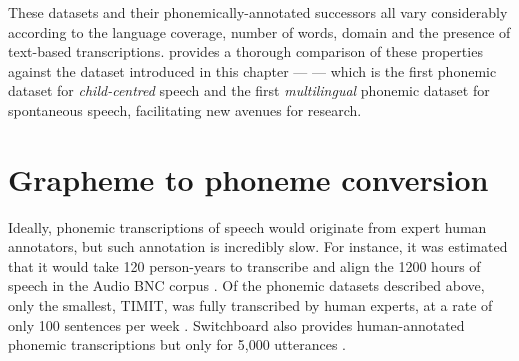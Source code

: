 \begin{sidewaystable}
\begin{threeparttable}
        \label{tab:13-dataset-properties}
    \end{threeparttable}
\end{sidewaystable}

These datasets and their phonemically-annotated successors all vary considerably according to the language coverage, number of words, domain and the presence of text-based transcriptions.  provides a thorough comparison of these properties against the dataset introduced in this chapter --- \ipachildes --- which is the first phonemic dataset for \emph{child-centred} speech and the first \emph{multilingual} phonemic dataset for spontaneous speech, facilitating new avenues for research. 

\section{Grapheme to phoneme conversion}\label{sec:13-g2p}



Ideally, phonemic transcriptions of speech would originate from expert human annotators, but such annotation is incredibly slow. For instance, it was estimated that it would take 120 person-years to transcribe and align the 1200 hours of speech in the Audio BNC corpus \citep{coleman2011mining}. Of the phonemic datasets described above, only the smallest, TIMIT, was fully transcribed by human experts, at a rate of only 100 sentences per week \citep{zue1996transcription, lamel1989speech}. Switchboard also provides human-annotated phonemic transcriptions but only for 5,000 utterances \citep{greenberg1996insights}.

